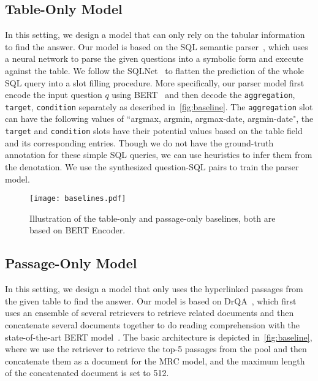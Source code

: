 \documentclass[11pt,a4paper]{article}
\begin{document}
\subsection{Table-Only Model}
In this setting, we design a model that can only rely on the tabular information to find the answer. Our model is based on the SQL semantic parser~\cite{zhong2017seq2sql,xu2017sqlnet}, which uses a neural network to parse the given questions into a symbolic form and execute against the table. We follow the SQLNet~\cite{xu2017sqlnet} to flatten the prediction of the whole SQL query into a slot filling procedure. More specifically, our parser model first encode the input question $q$ using BERT~\cite{devlin2019bert} and then decode the \texttt{aggregation}, \texttt{target}, \texttt{condition} separately as described in~\autoref{fig:baseline}. The \texttt{aggregation} slot can have the following values of ``argmax, argmin, argmax-date, argmin-date", the \texttt{target} and \texttt{condition} slots have their potential values based on the table field and its corresponding entries. Though we do not have the ground-truth annotation for these simple SQL queries, we can use heuristics to infer them from the denotation. We use the synthesized question-SQL pairs to train the parser model.

\begin{figure}[!t]
    \centering
    \texttt{[image: baselines.pdf]}
    \caption{Illustration of the table-only and passage-only baselines, both are based on BERT Encoder.}
    \label{fig:baseline}
    \vspace{-2ex}
\end{figure}


\subsection{Passage-Only Model}
In this setting, we design a model that only uses the hyperlinked passages from the given table to find the answer. Our model is based on DrQA~\cite{chen2017reading}, which first uses an ensemble of several retrievers to retrieve related documents and then concatenate several documents together to do reading comprehension with the state-of-the-art BERT model~\cite{devlin2019bert}. The basic architecture is depicted in~\autoref{fig:baseline}, where we use the retriever to retrieve the top-5 passages from the pool and then concatenate them as a document for the MRC model, and the maximum length of the concatenated document is set to 512.  
\end{document}
